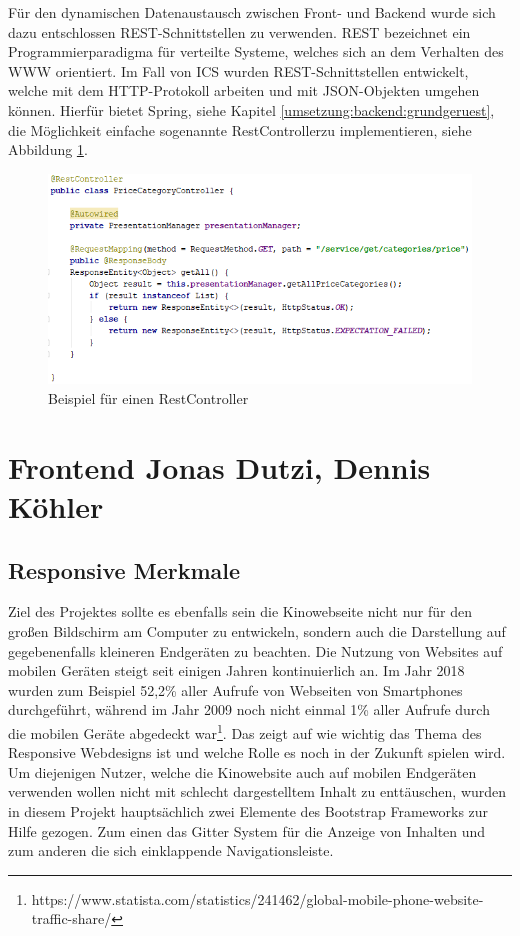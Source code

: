 	Für den dynamischen Datenaustausch zwischen Front- und Backend wurde sich dazu entschlossen \ac{REST}-Schnittstellen zu verwenden. \ac{REST} bezeichnet ein Programmierparadigma für verteilte Systeme, welches sich an dem Verhalten des \ac{WWW} orientiert.\autocite{REST} Im Fall von \ac{ICS} wurden \ac{REST}-Schnittstellen entwickelt, welche mit dem HTTP-Protokoll arbeiten und mit \ac{JSON}-Objekten umgehen können. Hierfür bietet Spring, siehe Kapitel \ref{umsetzung:backend:grundgeruest}, die Möglichkeit einfache sogenannte \glqq RestController\grqq zu implementieren, siehe Abbildung \ref{fig:beispiel_restcontroller}.
	
	\begin{figure}[H]
		\centering 
		\includegraphics[width=\textwidth]{img/beispiel_restcontroller}
		\captionsetup{format=hang}
		\caption[Beispiel für einen RestController]{\label{fig:beispiel_restcontroller}Beispiel für einen RestController}
	\end{figure}	
	
	\section[Frontend]{Frontend {\hfill \normalsize Jonas Dutzi, Dennis Köhler}}
	
	\subsection{Responsive Merkmale}
	Ziel des Projektes sollte es ebenfalls sein die Kinowebseite nicht nur für den großen Bildschirm am Computer zu entwickeln, sondern auch die Darstellung auf gegebenenfalls kleineren Endgeräten zu beachten. Die Nutzung von Websites auf mobilen Geräten steigt seit einigen Jahren kontinuierlich an. Im Jahr 2018 wurden zum Beispiel 52,2\% aller Aufrufe von Webseiten von Smartphones durchgeführt, während im Jahr 2009 noch nicht einmal 1\% aller Aufrufe durch die mobilen Geräte abgedeckt war\footnote{https://www.statista.com/statistics/241462/global-mobile-phone-website-traffic-share/}. Das zeigt auf wie wichtig das Thema des Responsive Webdesigns ist und welche Rolle es noch in der Zukunft spielen wird. Um diejenigen Nutzer, welche die Kinowebsite auch auf mobilen Endgeräten verwenden wollen nicht mit schlecht dargestelltem Inhalt zu enttäuschen, wurden in diesem Projekt hauptsächlich zwei Elemente des Bootstrap Frameworks zur Hilfe gezogen. Zum einen das Gitter System für die Anzeige von Inhalten und zum anderen die sich einklappende Navigationsleiste.
	
